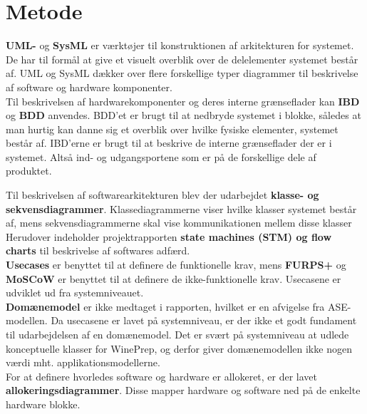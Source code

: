 \section{Metode}

\textbf{UML-} og \textbf{SysML} er værktøjer til konstruktionen af arkitekturen for systemet. De har til formål at give et visuelt overblik over de delelementer 
systemet består af. UML og SysML dækker over flere forskellige typer diagrammer til beskrivelse af software og hardware komponenter. \\

Til beskrivelsen af hardwarekomponenter og deres interne grænseflader kan \textbf{IBD} og \textbf{BDD} anvendes. BDD’et er brugt til at nedbryde systemet i blokke, 
således at man hurtig kan danne sig et overblik over hvilke fysiske elementer, systemet består af. IBD’erne er brugt til at beskrive de interne grænseflader der 
er i systemet. Altså ind- og udgangsportene som er på de forskellige dele af produktet.

Til beskrivelsen af softwarearkitekturen blev der udarbejdet \textbf{klasse- og sekvensdiagrammer}. Klassediagrammerne viser hvilke klasser systemet 
består af, mens sekvensdiagrammerne skal vise kommunikationen mellem disse klasser \\

Herudover indeholder projektrapporten \textbf{state machines (STM) og flow charts} til beskrivelse af softwares adfærd.\\

\textbf{Usecases}  er benyttet til at definere de funktionelle krav, mens \textbf{FURPS+} og \textbf{MoSCoW} er benyttet til at definere de 
ikke-funktionelle krav. Usecasene er udviklet ud fra systemniveauet.\\

\textbf{Domænemodel} er ikke medtaget i rapporten, hvilket er en afvigelse fra ASE-modellen. Da usecasene er lavet på systemniveau, er der ikke et godt 
fundament til udarbejdelsen af en domænemodel. Det er svært på systemniveau at udlede konceptuelle klasser for WinePrep, og derfor giver domænemodellen ikke 
nogen værdi mht. applikationsmodellerne.\\
 
For at definere hvorledes software og hardware er allokeret, er der lavet \textbf{allokeringsdiagrammer}. Disse mapper hardware og software ned på de enkelte
hardware blokke.\\
